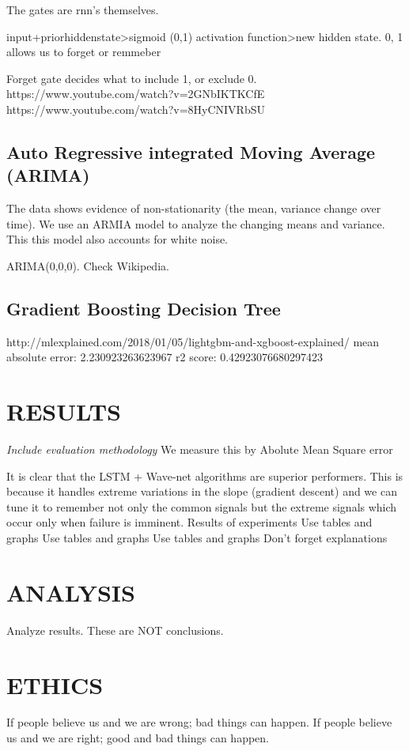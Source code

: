 \documentclass[]{llncs}
\begin{document}
The gates are rnn's themselves.

input+priorhiddenstate>sigmoid (0,1) activation function>new hidden state. 0, 1 allows us to forget or remmeber 

Forget gate decides what to include 1, or exclude 0. 
https://www.youtube.com/watch?v=2GNbIKTKCfE
https://www.youtube.com/watch?v=8HyCNIVRbSU

\subsection{Auto Regressive integrated Moving Average (ARIMA)}
The data shows evidence of non-stationarity (the mean, variance change over time). We use an ARMIA model to analyze the changing means and variance. This this model also accounts for white noise.\par ARIMA(0,0,0). Check Wikipedia.

\subsection{Gradient Boosting Decision Tree}
http://mlexplained.com/2018/01/05/lightgbm-and-xgboost-explained/
mean absolute error: 2.230923263623967
r2 score: 0.42923076680297423


\section{RESULTS}
{\em Include evaluation methodology}
We measure this by Abolute Mean Square error

It is clear that the LSTM + Wave-net algorithms are superior performers.
This is because it handles extreme variations in the slope (gradient descent) and we can tune it to remember not only the common signals but the extreme signals which occur only when failure is imminent.
Results of experiments
Use tables and graphs
Use tables and graphs
Use tables and graphs
Don't forget explanations
\section{ANALYSIS}
Analyze results.
These are NOT conclusions.
\section{ETHICS}
If people believe us and we are wrong; bad things can happen. If people believe us and we are right; good and bad things can happen.
\end{document}
